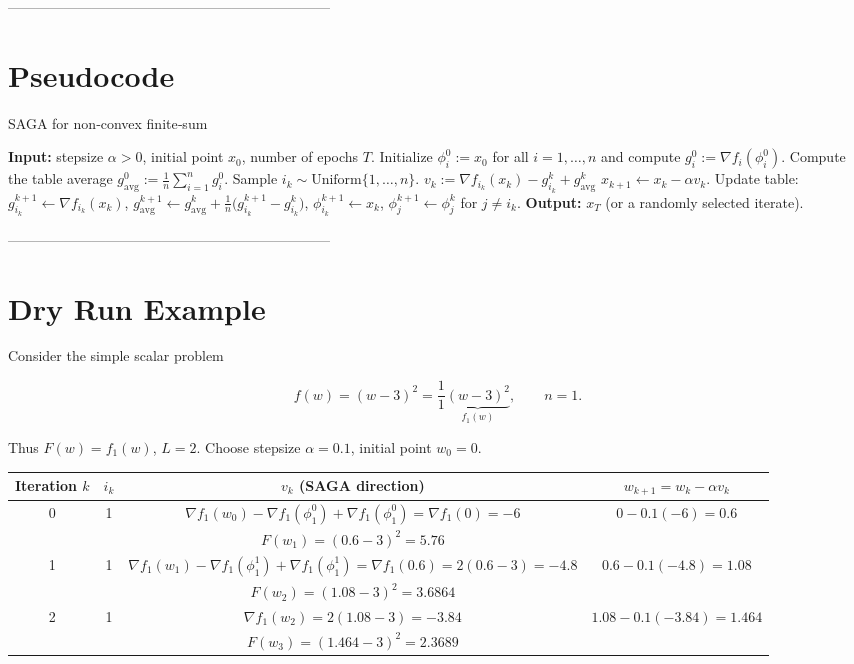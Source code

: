 \documentclass{article}
\begin{document}
---------------------------------------------------------------------

\section*{Pseudocode}

\begin{algorithm}[H]
\caption{SAGA for non‑convex finite‑sum}
\begin{algorithmic}[1]
\STATE \textbf{Input:} stepsize $\alpha>0$, initial point $x_0$, number of epochs $T$.
\STATE Initialize $\phi_i^0:=x_0$ for all $i=1,\dots,n$ and compute $g_i^0:=\nabla f_i(\phi_i^0)$.
\STATE Compute the table average $g_{\text{avg}}^0:=\frac1n\sum_{i=1}^{n} g_i^0$.
    \STATE Sample $i_k\sim\text{Uniform}\{1,\dots,n\}$.
    \STATE $v_k:=\nabla f_{i_k}(x_k)-g_{i_k}^k+g_{\text{avg}}^k$ \hfill{}
    \STATE $x_{k+1}\gets x_k-\alpha v_k$.
    \STATE Update table:
    \STATE\quad $g_{i_k}^{k+1}\gets \nabla f_{i_k}(x_k)$,
    \STATE\quad $g_{\text{avg}}^{k+1}\gets g_{\text{avg}}^{k}+ \frac{1}{n}\big(g_{i_k}^{k+1}-g_{i_k}^{k}\big)$,
    \STATE\quad $\phi_{i_k}^{k+1}\gets x_k$,
    \STATE\quad $\phi_{j}^{k+1}\gets\phi_{j}^{k}$ for $j\neq i_k$.
\ENDFOR
\STATE \textbf{Output:} $x_T$ (or a randomly selected iterate).
\end{algorithmic}
\end{algorithm}

---------------------------------------------------------------------

\section*{Dry Run Example}

Consider the simple scalar problem  

\[
f(w)=(w-3)^2=\frac1{1}\underbrace{(w-3)^2}_{f_1(w)} ,\qquad n=1.
\]

Thus $F(w)=f_1(w)$, $L=2$.  
Choose stepsize $\alpha=0.1$, initial point $w_0=0$.

\begin{center}
\begin{tabular}{c|c|c|c}
Iteration $k$ & $i_k$ & $v_k$ (SAGA direction) & $w_{k+1}=w_k-\alpha v_k$\\ \hline
0 & 1 & $\nabla f_1(w_0)-\nabla f_1(\phi_1^0)+\nabla f_1(\phi_1^0)
      =\nabla f_1(0)= -6$ & $0-0.1(-6)=0.6$\\
  &   & $F(w_1)=(0.6-3)^2=5.76$ & \\ \hline
1 & 1 & $\nabla f_1(w_1)-\nabla f_1(\phi_1^1)+\nabla f_1(\phi_1^1)
      =\nabla f_1(0.6)=2(0.6-3)=-4.8$ & $0.6-0.1(-4.8)=1.08$\\
  &   & $F(w_2)=(1.08-3)^2=3.6864$ & \\ \hline
2 & 1 & $\nabla f_1(w_2)=2(1.08-3)=-3.84$ & $1.08-0.1(-3.84)=1.464$\\
  &   & $F(w_3)=(1.464-3)^2=2.3689$ & 
\end{tabular}
\end{center}
\end{document}
